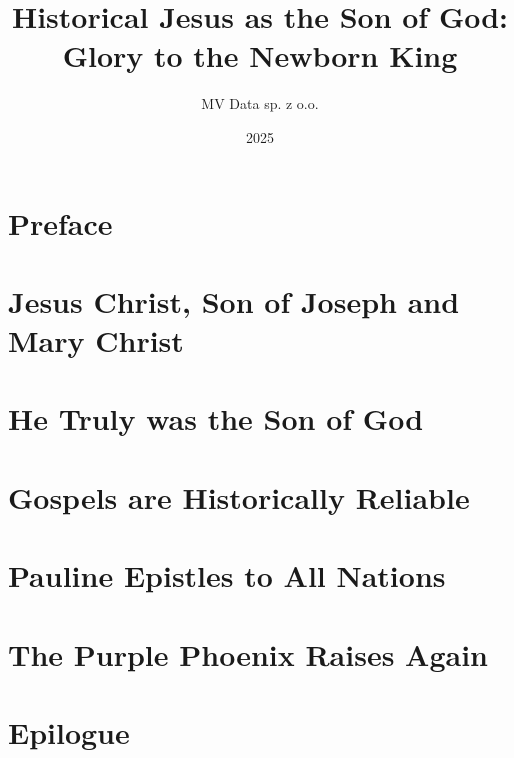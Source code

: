 \documentclass[12pt]{book}
\title{Historical Jesus as the Son of God: Glory to the Newborn King}
\author{MV Data sp. z o.o.}
\date{2025}
\begin{document}
\maketitle

\tableofcontents

\chapter*{Preface}


\chapter{Jesus Christ, Son of Joseph and Mary Christ}\label{ch:jesus-christ-son-of-joseph-and-mary-christ}


\chapter{He Truly was the Son of God}\label{ch:he-truly-was-the-son-of-god}


\chapter{Gospels are Historically Reliable}\label{ch:gospels-are-historically-reliable}


\chapter{Pauline Epistles to All Nations}\label{ch:pauline-epistles-to-all-nations}


\chapter{The Purple Phoenix Raises Again}\label{ch:the-purple-phoenix-raises-again}


\chapter*{Epilogue}

\end{document}
